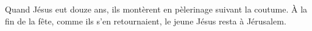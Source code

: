 Quand Jésus eut douze ans, ils montèrent en pèlerinage suivant la coutume.
À la fin de la fête, comme ils s’en retournaient,
	le jeune Jésus resta à Jérusalem.

